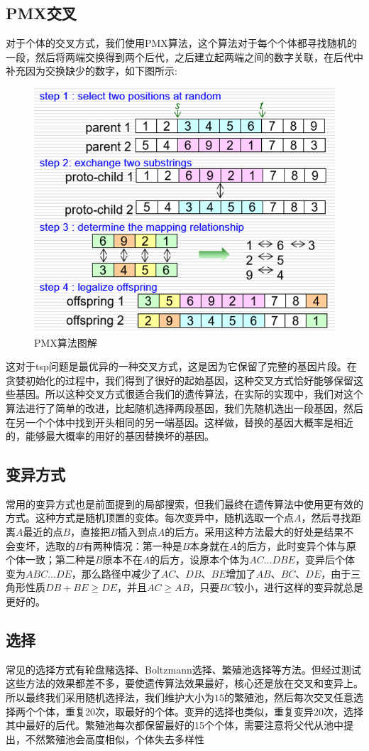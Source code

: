\documentclass[withoutpreface,bwprint]{cumcmthesis} %
\begin{document}
\subsection{PMX交叉}
对于个体的交叉方式，我们使用PMX算法，这个算法对于每个个体都寻找随机的一段，然后将两端交换得到两个后代，之后建立起两端之间的数字关联，在后代中补充因为交换缺少的数字，如下图所示:
\begin{figure}[H]
		\centering
		\includegraphics[width=0.5\linewidth]{PMX}
		\caption{PMX算法图解}
\end{figure}
这对于tsp问题是最优异的一种交叉方式，这是因为它保留了完整的基因片段。在贪婪初始化的过程中，我们得到了很好的起始基因，这种交叉方式恰好能够保留这些基因。所以这种交叉方式很适合我们的遗传算法，在实际的实现中，我们对这个算法进行了简单的改进，比起随机选择两段基因，我们先随机选出一段基因，然后在另一个个体中找到开头相同的另一端基因。这样做，替换的基因大概率是相近的，能够最大概率的用好的基因替换坏的基因。
\subsection{变异方式}
常用的变异方式也是前面提到的局部搜索，但我们最终在遗传算法中使用更有效的方式。这种方式是随机顶置的变体。每次变异中，随机选取一个点$A$，然后寻找距离$A$最近的点$B$，直接把$B$插入到点$A$的后方。采用这种方法最大的好处是结果不会变坏，选取的$B$有两种情况：第一种是$B$本身就在$A$的后方，此时变异个体与原个体一致；第二种是$B$原本不在$A$的后方，设原本个体为$AC...DBE$，变异后个体变为$ABC...DE$，那么路径中减少了$AC$、$DB$、$BE$增加了$AB$、$BC$、$DE$，由于三角形性质$DB + BE \geq DE$，并且$AC \geq AB$，只要$BC$较小，进行这样的变异就总是更好的。
\subsection{选择}
常见的选择方式有轮盘赌选择、Boltzmann选择、繁殖池选择等方法。但经过测试这些方法的效果都差不多，要使遗传算法效果最好，核心还是放在交叉和变异上。所以最终我们采用随机选择法，我们维护大小为$15$的繁殖池，然后每次交叉任意选择两个个体，重复20次，取最好的个体。变异的选择也类似，重复变异20次，选择其中最好的后代。繁殖池每次都保留最好的15个个体，需要注意将父代从池中提出，不然繁殖池会高度相似，个体失去多样性
\end{document}
